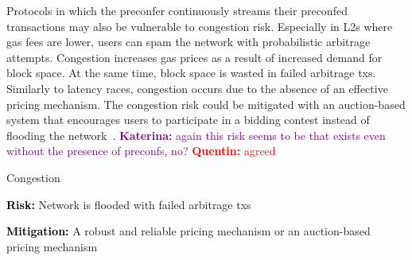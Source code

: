 \documentclass[a4paper]{article}
\theoremstyle{boldstyle}
\newlength{\entrysep}
\newcommand{\risk}[1]{\par\noindent\textbf{\textcolor{black}{Risk:}} #1\par\vspace{\entrysep}}
\newcommand{\consideration}[1]{\par\noindent\textbf{\textcolor{black}{Consideration:}} #1\par\vspace{\entrysep}}
\newcommand{\mitigation}[1]{\par\noindent\textbf{\textcolor{black}{Mitigation:}} #1}
\newcommand{\cm}[1]{\textcolor{blue}{\textbf{Conor:} #1}}
\newcommand{\qb}[1]{\textcolor{red}{\textbf{Quentin:} #1}}
\newcommand{\ks}[1]{\textcolor{purple}{\textbf{Katerina:} #1}}
\begin{document}
        Protocols in which the preconfer continuously streams their preconfed transactions may also be vulnerable to congestion risk. Especially in L2s where gas fees are lower, users can spam the network with probabilistic arbitrage attempts. Congestion increases gas prices as a result of increased demand for block space. At the same time, block space is wasted in failed arbitrage txs. Similarly to latency races, congestion occurs due to the absence of an effective pricing mechanism. The congestion risk could be mitigated with an auction-based system that encourages users to participate in a bidding contest instead of flooding the network~\cite{W:StrawmanningBasedPreconfirmations,W:BasedPreconfirmationswithMulti-roundMEV-Boost}.
        \ks{again this risk seems to be that exists even without the presence of preconfs, no?} \qb{agreed}
        \begin{riskbox}{Congestion}
            \risk{Network is flooded with failed arbitrage txs}
            \mitigation{A robust and reliable pricing mechanism or an auction-based pricing mechanism}
        \end{riskbox} 
\fi








        
\end{document}
